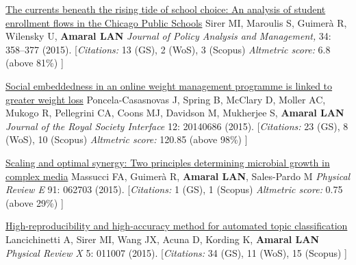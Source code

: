 \NumberedItem{\makebox[0.8cm][r]{[114]}}
\href{/people/amaral/currents-beneath-rising-tide-school-choice-analysis-student-enrollment-flows-chicago-public-schools}
{The currents beneath the rising tide of school choice: An analysis of student enrollment flows in the Chicago Public Schools}
\newline
Sirer MI, Maroulis S, Guimer\`a R, Wilensky U, {\textbf{Amaral LAN}}
\newline
\textit{Journal of Policy Analysis and Management,}
    34:
358--377 (2015).
    \newline
    \hfill [{\em{Citations:}} 13 (GS),
    2 (WoS), 3 (Scopus)
        {\hspace*{1cm} \em{Altmetric score:}}  6.8 (above 81\%)
    ]
\newline
\Gap
~
\Gap

\NumberedItem{\makebox[0.8cm][r]{[113]}}
\href{/people/amaral/social-embeddedness-online-weight-management-programme-linked-greater-weight-loss}
{Social embeddedness in an online weight management programme is linked to greater weight loss}
\newline
Poncela-Casasnovas J, Spring B, McClary D, Moller AC, Mukogo R, Pellegrini CA, Coons MJ, Davidson M, Mukherjee S, {\textbf{Amaral LAN}}
\newline
\textit{Journal of the Royal Society Interface}
    12:
20140686 (2015).
    \newline
    \hfill [{\em{Citations:}} 23 (GS),
    8 (WoS), 10 (Scopus)
        {\hspace*{1cm} \em{Altmetric score:}}  120.85 (above 98\%)
    ]
\newline
\Gap
~
\Gap

\NumberedItem{\makebox[0.8cm][r]{[112]}}
\href{/people/amaral/scaling-and-optimal-synergy-two-principles-determining-microbial-growth-complex-media}
{Scaling and optimal synergy: Two principles determining microbial growth in complex media}
\newline
Massucci FA, Guimer\`a R, {\textbf{Amaral LAN}}, Sales-Pardo M
\newline
\textit{Physical Review E}
    91:
062703 (2015).
    \newline
    \hfill [{\em{Citations:}} 1 (GS), 1 (Scopus)
        {\hspace*{1cm} \em{Altmetric score:}}  0.75 (above 29\%)
    ]
\newline
\Gap
~
\Gap

\NumberedItem{\makebox[0.8cm][r]{[111]}}
\href{/people/amaral/high-reproducibility-and-high-accuracy-method-automated-topic-classification}
{High-reproducibility and high-accuracy method for automated topic classification}
\newline
Lancichinetti A, Sirer MI, Wang JX, Acuna D, Kording K, {\textbf{Amaral LAN}}
\newline
\textit{Physical Review X}
    5:
011007 (2015).
    \newline
    \hfill [{\em{Citations:}} 34 (GS),
    11 (WoS), 15 (Scopus)
    ]
\newline
\Gap
~
\Gap

